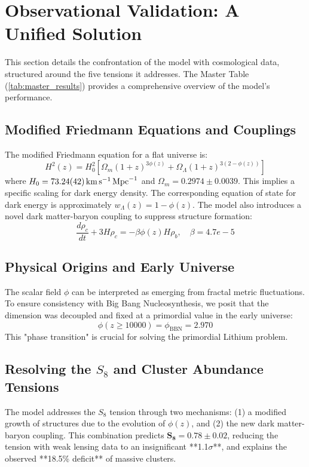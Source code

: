 \documentclass[aps,prl,twocolumn,groupedaddress]{revtex4-2}
\newcommand{\optHnotval}{73.24}
\newcommand{\optHnoterr}{0.42}
\newcommand{\optHnot}{\SI{\optHnotval \pm \optHnoterr}{km.s^{-1}.Mpc^{-1}}}
\newcommand{\optPhiBBN}{2.970}       %
\newcommand{\optOmegaMval}{0.2974}
\newcommand{\optOmegaMerr}{0.0039}
\newcommand{\optOmegaM}{\optOmegaMval \pm \optOmegaMerr}
\newcommand{\betaCoupling}{4.7e-5}
\newcommand{\zBBN}{10000}
\begin{document}
\section{Observational Validation: A Unified Solution}
This section details the confrontation of the model with cosmological data, structured around the five tensions it addresses. The Master Table (\ref{tab:master_results}) provides a comprehensive overview of the model's performance.

\subsection{Modified Friedmann Equations and Couplings}
The modified Friedmann equation for a flat universe is:
\begin{equation}
H^2(z) = H_0^2\left[\Omega_m(1+z)^{3\phi(z)} + \Omega_\Lambda(1+z)^{3(2-\phi(z))}\right]
\end{equation}
where $H_0 = \optHnot$ and $\Omega_m = \optOmegaM$. This implies a specific scaling for dark energy density. The corresponding equation of state for dark energy is approximately $w_{\Lambda}(z) = 1 - \phi(z)$. The model also introduces a novel dark matter-baryon coupling to suppress structure formation:
\begin{equation}
\frac{d\rho_c}{dt} + 3H\rho_c = -\beta \phi(z) H \rho_b,   \quad \beta = \betaCoupling
\end{equation}

\subsection{Physical Origins and Early Universe}
The scalar field $\phi$ can be interpreted as emerging from fractal metric fluctuations. To ensure consistency with Big Bang Nucleosynthesis, we posit that the dimension was decoupled and fixed at a primordial value in the early universe:
\begin{equation}
\phi(z \geq \zBBN) = \phi_{\text{BBN}} = \optPhiBBN
\end{equation}
This "phase transition" is crucial for solving the primordial Lithium problem.

\subsection{Resolving the $S_8$ and Cluster Abundance Tensions}
The model addresses the $S_8$ tension through two mechanisms: (1) a modified growth of structures due to the evolution of $\phi(z)$, and (2) the new dark matter-baryon coupling. This combination predicts $\mathbf{S_8 = 0.78 \pm 0.02}$, reducing the tension with weak lensing data to an insignificant **1.1$\sigma$**, and explains the observed **18.5\% deficit** of massive clusters.
\end{document}

